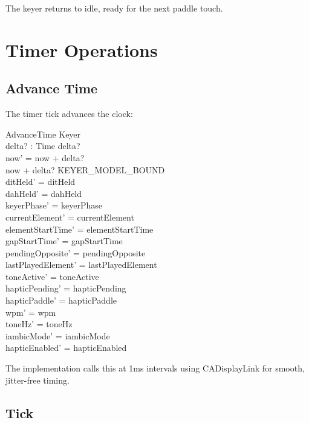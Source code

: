 \documentclass[a4paper,10pt,fleqn]{article}
\begin{document}
The keyer returns to idle, ready for the next paddle touch.

\section{Timer Operations}

\subsection{Advance Time}

The timer tick advances the clock:

\begin{schema}{AdvanceTime}
\Delta Keyer \\
delta? : Time
\where
delta?  \\
now' = now + delta? \\
now + delta? \leq KEYER\_MODEL\_BOUND \\
ditHeld' = ditHeld \\
dahHeld' = dahHeld \\
keyerPhase' = keyerPhase \\
currentElement' = currentElement \\
elementStartTime' = elementStartTime \\
gapStartTime' = gapStartTime \\
pendingOpposite' = pendingOpposite \\
lastPlayedElement' = lastPlayedElement \\
toneActive' = toneActive \\
hapticPending' = hapticPending \\
hapticPaddle' = hapticPaddle \\
wpm' = wpm \\
toneHz' = toneHz \\
iambicMode' = iambicMode \\
hapticEnabled' = hapticEnabled
\end{schema}

The implementation calls this at 1ms intervals using CADisplayLink for
smooth, jitter-free timing.

\subsection{Tick}
\end{document}
